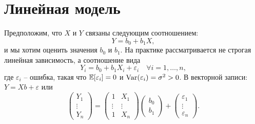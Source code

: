 \graphicspath{{./chapters/chapter08/}}
\chapter{Линейная модель}

\begin{exmp}
	Предположим, что $X$ и $Y$ связаны следующим соотношением:
	\[ Y = b_0 + b_1 X, \]
	и мы хотим оценить значения $b_0$ и $b_1$. На практике рассматривается не строгая линейная зависимость, а соотношение вида
	\[ Y_i = b_0 + b_1 X_i + \varepsilon_i \quad \forall i = 1, \dots, n, \]
	где $\varepsilon_i$ -- ошибка, такая что $\mathbb{E}[\varepsilon_i] = 0$ и $\mathrm{Var}(\varepsilon_i) = \sigma^2 > 0$. В векторной записи: $Y = Xb + \varepsilon$ или
	\[  \begin{pmatrix}
	Y_1 \\
	\vdots \\
	Y_n
	\end{pmatrix}  = 
	\begin{pmatrix}
	1 & X_1 \\
	\vdots & \vdots \\
	1 & X_n
	\end{pmatrix}
	\begin{pmatrix}
	b_0 \\
	b_1
	\end{pmatrix}
	+
	\begin{pmatrix}
	\varepsilon_1 \\
	\vdots \\
	\varepsilon_n
	\end{pmatrix}.\] 
\end{exmp}

